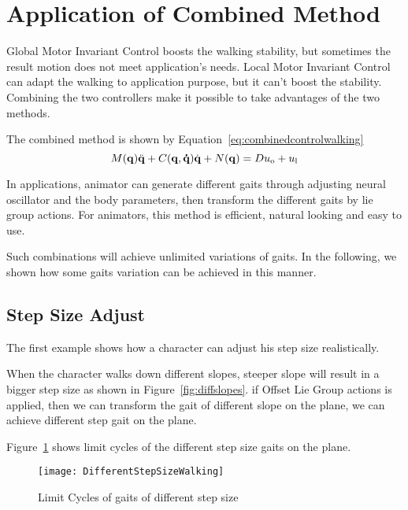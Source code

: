 \section{Application of Combined Method}
Global Motor Invariant Control boosts the walking stability, but sometimes  the result motion does not meet application's needs.
Local Motor Invariant Control can adapt the walking to application purpose, but it can't boost the stability.
Combining the two controllers make it possible to take advantages of the two methods.

The combined method is shown by Equation~\ref{eq:combinedcontrolwalking}
\begin{equation}
\label{eq:combinedcontrolwalking}
M(\mathbf{q}) \ddot{\mathbf{q}} + C(\mathbf{q,\dot{q}})\dot{\mathbf{q}} + N(\mathbf{q}) = Du_{\mathrm{o}}+u_{\mathrm{l}}
\end{equation}

In applications, animator can generate different gaits through  adjusting neural oscillator and the body parameters, then transform the different gaits by lie group actions.
For animators, this method is efficient, natural looking and easy to use.

Such combinations will achieve unlimited variations of gaits.
In the following, we shown how some gaits variation can be achieved in this manner. 

\subsection{Step Size Adjust}
The first example shows how a character can adjust his step size realistically.



When the character walks down different slopes, steeper slope will result in a bigger step size as shown in Figure~\ref{fig:diffslopes}. 
if Offset Lie Group actions is applied, then we can transform the gait of different slope on the plane, we can achieve different step gait on the plane.

Figure~\ref{fig:differentstepsizeonplaine} shows limit cycles of the different step size gaits on the plane.
\begin{figure}[!htbp]
  \begin{center}
      \texttt{[image: DifferentStepSizeWalking]}
    \caption{Limit Cycles of gaits of different step size}
    \label{fig:differentstepsizeonplaine}
\end{center}
\end{figure}


